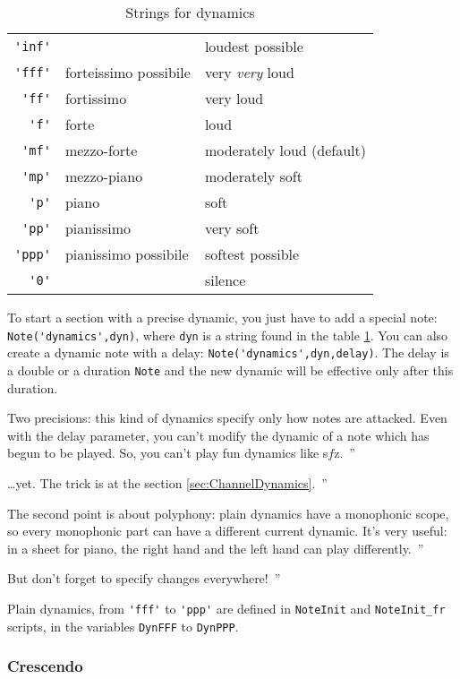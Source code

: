\documentclass{article}
\newcommand{\note}{\lstinline!Note!\xspace}
\newcommand\sfz{s$\!f\!$z\xspace}
\newenvironment{meenv}{ \par \noindent \makebox[6em][r]{ \textcolor{mecolor}{Me}: `` --~}}{~''}
\newenvironment{myselfenv}{ \par \noindent \makebox[6em][r]{ \textcolor{myselfcolor}{Myself}: `` --~}}{~''}
\newcommand{\me}[1]{\begin{meenv}#1\end{meenv}}
\newcommand{\myself}[1]{\begin{myselfenv}#1\end{myselfenv}}
\begin{document}
\begin{table}
	\centering
	\begin{tabular}{rll}
		\lstinline!'inf'! & & loudest possible \\
		\lstinline!'fff'! & forteissimo possibile & very \emph{very} loud \\
		\lstinline!'ff'! & fortissimo & very loud \\
		\lstinline!'f'! & forte & loud \\
		\lstinline!'mf'! & mezzo-forte & moderately loud (default) \\
		\lstinline!'mp'! & mezzo-piano & moderately soft \\
		\lstinline!'p'! & piano & soft \\
		\lstinline!'pp'! & pianissimo & very soft \\
		\lstinline!'ppp'! & pianissimo possibile & softest possible \\
		\lstinline!'0'! & & silence \\
	\end{tabular}
	\caption{Strings for dynamics}
	\label{tab:dynamics}
\end{table}

To start a section with a precise dynamic, you just have to add a special note: \lstinline!Note('dynamics',dyn)!, where \lstinline!dyn! is a string found in the table \ref{tab:dynamics}. You can also create a dynamic note with a delay: \lstinline!Note('dynamics',dyn,delay)!. The delay is a double or a duration \note and the new dynamic will be effective only after this duration.

\myself{Two precisions: this kind of dynamics specify only how notes are attacked. Even with the delay parameter, you can't modify the dynamic of a note which has begun to be played. So, you can't play fun dynamics like \sfz.}
\me{\dots yet. The trick is at the section \ref{sec:ChannelDynamics}.}
\myself{The second point is about polyphony: plain dynamics have a monophonic scope, so every monophonic part can have a different current dynamic. It's very useful: in a sheet for piano, the right hand and the left hand can play differently.}
\me{But don't forget to specify changes everywhere!}

Plain dynamics, from \lstinline!'fff'! to \lstinline!'ppp'! are defined in \lstinline!NoteInit! and \lstinline!NoteInit_fr! scripts, in the variables \lstinline!DynFFF! to \lstinline!DynPPP!.

\subsubsection{Crescendo}
\label{sec:Crescendo}
\end{document}
